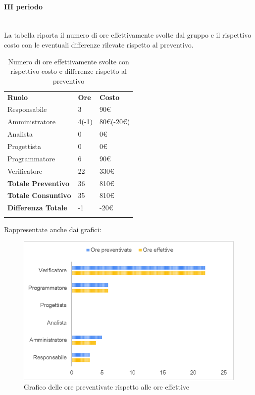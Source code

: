 \paragraph{III periodo}  \mbox{} \\
La tabella riporta il numero di ore effettivamente svolte dal gruppo e il rispettivo costo con le eventuali differenze rilevate rispetto al preventivo.
\begin{longtable} {							
		>{}p{40mm}  
		>{}p{20mm}	
		>{}p{28mm}			
	}			
	\rowcolor{gray!50}
	
	\textbf{Ruolo}            & \textbf{Ore} & \textbf{Costo}       \TBstrut \\
	Responsabile              & 3            & 90\euro              \TBstrut \\
	Amministratore            & 4(-1)        & 80\euro (-20\euro)   \TBstrut \\
	Analista                  & 0            & 0\euro               \TBstrut \\
	Progettista               & 0            & 0\euro               \TBstrut \\
	Programmatore             & 6            & 90\euro              \TBstrut \\
	Verificatore              & 22           & 330\euro             \TBstrut \\
	\textbf{Totale Preventivo}& 36           & 810\euro             \TBstrut \\	
	\textbf{Totale Consuntivo}& 35           & 810\euro             \TBstrut \\	
	\textbf{Differenza Totale}& -1           & -20\euro             \TBstrut \\
	\rowcolor{white}
	\caption{Numero di ore effettivamente svolte con rispettivo costo e differenze rispetto al preventivo}	
\end{longtable}

Rappresentate anche dai grafici:
\begin{figure} [H]
	\includegraphics[width=\linewidth]{./img/Grafici/ra-consuntivo7.png}
	\caption{Grafico delle ore preventivate rispetto alle ore effettive}
\end{figure}

